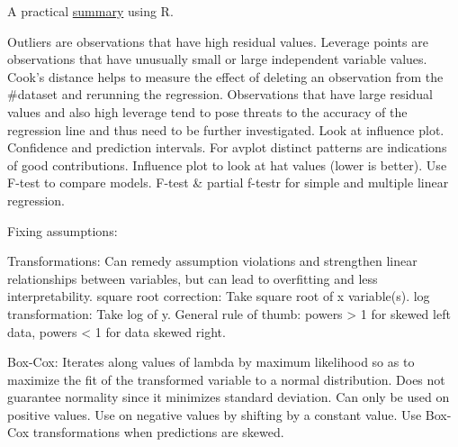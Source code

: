 \documentclass[]{book}
\begin{document}
A practical \href{http://www.statmethods.net/stats/rdiagnostics.html}{summary} using R.

Outliers are observations that have high residual values. Leverage points are observations that have unusually small or large independent variable values. Cook's distance helps to measure the effect of deleting an observation from the \#dataset and rerunning the regression. Observations that have large residual values and also high leverage tend to pose threats to the accuracy of the regression line and thus need to be further investigated. Look at influence plot. Confidence and prediction intervals. For avplot distinct patterns are indications of good contributions. Influence plot to look at hat values (lower is better). Use F-test to compare models. F-test \& partial f-testr for simple and multiple linear regression.

Fixing assumptions:

Transformations: Can remedy assumption violations and strengthen linear relationships between variables, but can lead to overfitting and less interpretability. square root correction: Take square root of x variable(s). log transformation: Take log of y. General rule of thumb: powers \textgreater{} 1 for skewed left data, powers \textless{} 1 for data skewed right.

Box-Cox: Iterates along values of lambda by maximum likelihood so as to maximize the fit of the transformed variable to a normal distribution. Does not guarantee normality since it minimizes standard deviation. Can only be used on positive values. Use on negative values by shifting by a constant value. Use Box-Cox transformations when predictions are skewed.
\end{document}
